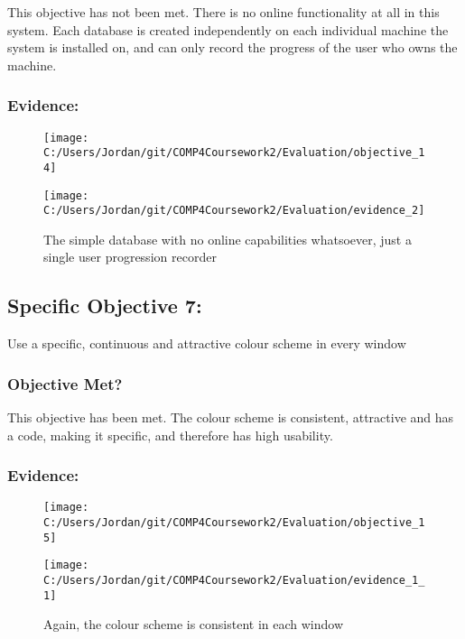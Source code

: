 This objective has not been met. There is no online functionality at all in this system. Each database is created independently on each individual machine the system is installed on, and can only record the progress of the user who owns the machine.

\subsubsection{Evidence: }

\begin{figure}[H]
	\texttt{[image: C:/Users/Jordan/git/COMP4Coursework2/Evaluation/objective\_14]}
\end{figure}

\begin{figure}[H]
	\texttt{[image: C:/Users/Jordan/git/COMP4Coursework2/Evaluation/evidence\_2]}
	\caption{The simple database with no online capabilities whatsoever, just a single user progression recorder}
\end{figure}

\subsection{Specific Objective 7: }

Use a specific, continuous and attractive colour scheme in every window

\subsubsection{Objective Met?}

This objective has been met. The colour scheme is consistent, attractive and has a code, making it specific, and therefore has high usability.

\subsubsection{Evidence: }

\begin{figure}[H]
	\texttt{[image: C:/Users/Jordan/git/COMP4Coursework2/Evaluation/objective\_15]}
\end{figure}

\begin{figure}[H]
	\texttt{[image: C:/Users/Jordan/git/COMP4Coursework2/Evaluation/evidence\_1\_1]}
	\caption{Again, the colour scheme is consistent in each window}
\end{figure}

